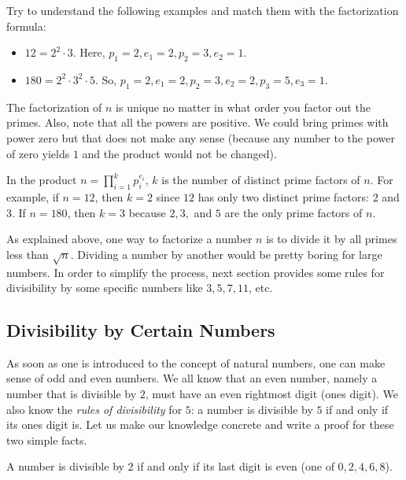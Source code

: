 \documentclass{subfile}
\begin{document}
	\begin{example}
		Try to understand the following examples and match them with the factorization formula:
		\begin{itemize}
			\item $12=2^2\cdot3$. Here, $p_1=2,e_1=2,p_2=3,e_2=1$.
			\item $180=2^2\cdot 3^2\cdot 5$. So,  $p_1=2,e_1=2,p_2=3,e_2=2,p_3=5,e_3=1$.
		\end{itemize}
		The factorization of $n$ is unique no matter in what order you factor out the primes. Also, note that all the powers are positive. We could bring primes with power zero but that does not make any sense (because any number to the power of zero yields $1$ and the product would not be changed).
	\end{example}

	\begin{note}
		In the product $n=\prod\limits_{i=1}^{k}p_i^{e_i}$, $k$ is the number of distinct prime factors of $n$. For example, if $n=12$, then $k=2$ since $12$ has only two distinct prime factors: $2$ and $3$. If $n=180$, then $k=3$ because $2,3,$ and $5$ are the only prime factors of $n$.
	\end{note}

	As explained above, one way to factorize a number $n$ is to divide it by all primes less than $\sqrt n$. Dividing a number by another would be pretty boring for large numbers. In order to simplify the process, next section provides some rules for divisibility by some specific numbers like $3, 5, 7, 11$, etc.

\subsection{Divisibility by Certain Numbers}\label{subs:divrules}

As soon as one is introduced to the concept of natural numbers, one can make sense of odd and even numbers. We all know that an even number, namely a number that is divisible by $2$, must have an even rightmost digit (ones digit). We also know the \textit{rules of divisibility} for $5$: a number is divisible by $5$ if and only if its ones digit is. Let us make our knowledge concrete and write a proof for these two simple facts.

	\begin{proposition}[Divisibility by $2$]
		A number is divisible by $2$ if and only if its last digit is even (one of $0,2,4,6,8$).
	\end{proposition}
\end{document}
